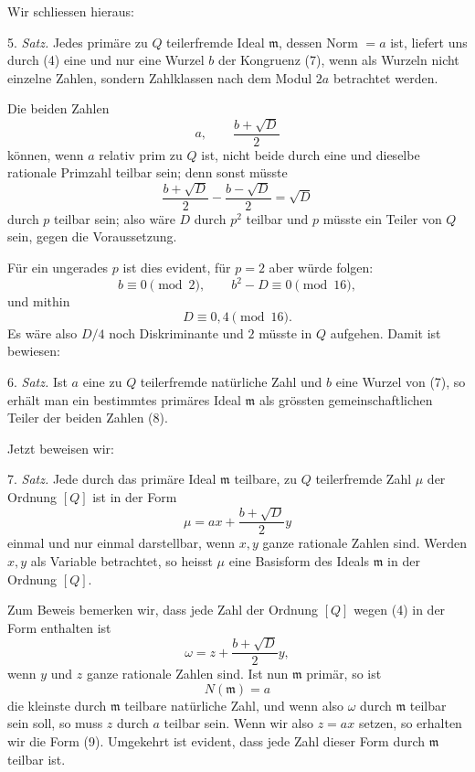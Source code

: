 \documentclass[11pt]{article}
\begin{document}
Wir schliessen hieraus:

5. \emph{Satz.} Jedes primäre zu $Q$ teilerfremde Ideal $\mathfrak m$, dessen Norm $=a$ ist, liefert uns durch (4) eine und nur eine Wurzel $b$ der Kongruenz (7), wenn als Wurzeln nicht einzelne Zahlen, sondern Zahlklassen nach dem Modul $2a$ betrachtet werden.

Die beiden Zahlen
\begin{equation}
 a,\qquad \frac{b+\sqrt D}{2}
\tag{8}
\end{equation}
können, wenn $a$ relativ prim zu $Q$ ist, nicht beide durch eine und dieselbe rationale Primzahl teilbar sein; denn sonst müsste
\[
 \frac{b+\sqrt D}{2}-\frac{b-\sqrt D}{2}=\sqrt D
\]
durch $p$ teilbar sein; also wäre $D$ durch $p^2$ teilbar und $p$ müsste ein Teiler von $Q$ sein, gegen die Voraussetzung.

Für ein ungerades $p$ ist dies evident, für $p=2$ aber würde folgen:
\[
 b\equiv0\pmod2,
 \qquad b^2-D\equiv0\pmod{16},
\]
und mithin
\[
 D\equiv0,4\pmod{16}.
\]
Es wäre also $D/4$ noch Diskriminante und $2$ müsste in $Q$ aufgehen. Damit ist bewiesen:

6. \emph{Satz.} Ist $a$ eine zu $Q$ teilerfremde natürliche Zahl und $b$ eine Wurzel von (7), so erhält man ein bestimmtes primäres Ideal $\mathfrak m$ als grössten gemeinschaftlichen Teiler der beiden Zahlen (8).

Jetzt beweisen wir:

7. \emph{Satz.} Jede durch das primäre Ideal $\mathfrak m$ teilbare, zu $Q$ teilerfremde Zahl $\mu$ der Ordnung $[Q]$ ist in der Form
\begin{equation}
 \mu=ax+\frac{b+\sqrt D}{2}y
\tag{9}
\end{equation}
einmal und nur einmal darstellbar, wenn $x,y$ ganze rationale Zahlen sind. Werden $x,y$ als Variable betrachtet, so heisst $\mu$ eine Basisform des Ideals $\mathfrak m$ in der Ordnung $[Q]$.

Zum Beweis bemerken wir, dass jede Zahl der Ordnung $[Q]$ wegen (4) in der Form enthalten ist
\begin{equation}
 \omega=z+\frac{b+\sqrt D}{2}y,
\tag{10}
\end{equation}
wenn $y$ und $z$ ganze rationale Zahlen sind. Ist nun $\mathfrak m$ primär, so ist
\begin{equation}
 N(\mathfrak m)=a
\tag{11}
\end{equation}
die kleinste durch $\mathfrak m$ teilbare natürliche Zahl, und wenn also $\omega$ durch $\mathfrak m$ teilbar sein soll, so muss $z$ durch $a$ teilbar sein. Wenn wir also $z=ax$ setzen, so erhalten wir die Form (9). Umgekehrt ist evident, dass jede Zahl dieser Form durch $\mathfrak m$ teilbar ist.
\end{document}
